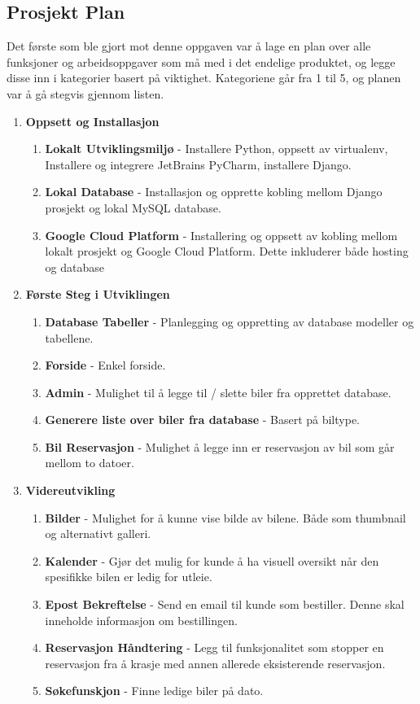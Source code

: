 \subsection{Prosjekt Plan}
Det første som ble gjort mot denne oppgaven var å lage en plan over alle funksjoner og arbeidsoppgaver som må med i det endelige produktet, og legge disse inn i kategorier basert på viktighet. Kategoriene går fra 1 til 5, og planen var å gå stegvis gjennom listen. 
 \begin{enumerate}
 
  \item \textbf{Oppsett og Installasjon}
  \begin{enumerate}
  	\item \textbf{Lokalt Utviklingsmiljø} - Installere Python, oppsett av virtualenv, Installere og integrere JetBrains PyCharm, installere Django.
  	\item \textbf{Lokal Database} - Installasjon og opprette kobling mellom Django prosjekt og lokal MySQL database.
  	\item \textbf{Google Cloud Platform} - Installering og oppsett av kobling mellom lokalt prosjekt og Google Cloud Platform. Dette inkluderer både hosting og database
  \end{enumerate}
  
  \item \textbf{Første Steg i Utviklingen}
  \begin{enumerate}
  	\item \textbf{Database Tabeller} - Planlegging og oppretting av database modeller og tabellene.
  	\item \textbf{Forside} - Enkel forside.
  	\item \textbf{Admin} - Mulighet til å legge til / slette biler fra opprettet database.
  	\item \textbf{Generere liste over biler fra database} - Basert på biltype.
  	\item \textbf{Bil Reservasjon} - Mulighet å legge inn er reservasjon av bil som går mellom to datoer.
  \end{enumerate}
  
  \item \textbf{Videreutvikling}
  \begin{enumerate} 
  	\item \textbf{Bilder} - Mulighet for å kunne vise bilde av bilene. Både som thumbnail og alternativt galleri.
	\item \textbf{Kalender} - Gjør det mulig for kunde å ha visuell oversikt når den spesifikke bilen er ledig for utleie. 
	\item \textbf{Epost Bekreftelse} - Send en email til kunde som bestiller. Denne skal inneholde informasjon om bestillingen.
	\item \textbf{Reservasjon Håndtering} - Legg til funksjonalitet som stopper en reservasjon fra å krasje med annen allerede eksisterende reservasjon.
	\item \textbf{Søkefunskjon} - Finne ledige biler på dato.
  \end{enumerate}
  

\end{enumerate}
